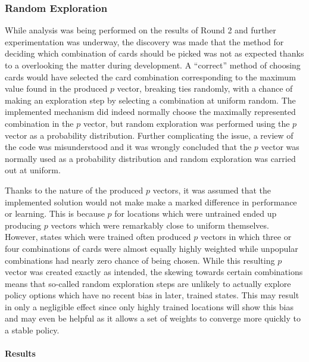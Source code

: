 
\subsubsection{Random Exploration}
\label{sec:findings-expts-rand}

While analysis was being performed on the results of Round 2 and further
experimentation was underway,
the discovery was made that the method for deciding which combination of cards
should be picked was not as expected
thanks to a overlooking the matter during development.
%
A ``correct'' method of choosing cards would have selected the card combination
corresponding to the maximum value found in the produced $p$ vector,
breaking ties randomly,
with a chance of making an exploration step by selecting a combination at
uniform random.
%
The implemented mechanism did indeed normally choose the maximally represented
combination in the $p$ vector,
but random exploration was performed using the $p$ vector as a probability
distribution.
%
Further complicating the issue,
a review of the code was misunderstood and it was wrongly concluded that
the $p$ vector was normally used as a probability distribution
and random exploration was carried out at uniform.

Thanks to the nature of the produced $p$ vectors,
it was assumed that the implemented solution would not make make a marked
difference in performance or learning.
%
This is because $p$ for locations which were untrained 
ended up producing $p$ vectors which were remarkably close to
uniform themselves.
%
However,
states which were trained often produced $p$ vectors in which
three or four combinations of cards were almost equally highly weighted
while unpopular combinations had nearly zero chance of being chosen.
%
While this resulting $p$ vector was created exactly as intended,
the skewing towards certain combinations means that so-called
random exploration steps are unlikely to actually explore policy options
which have no recent bias
in later, trained states.
%
This may result in only a negligible effect since
only highly trained locations will show this bias
and may even be helpful as it allows a set of weights to converge more quickly
to a stable policy.


\paragraph{Results}
\label{sec:findings-expts-rand-results}


